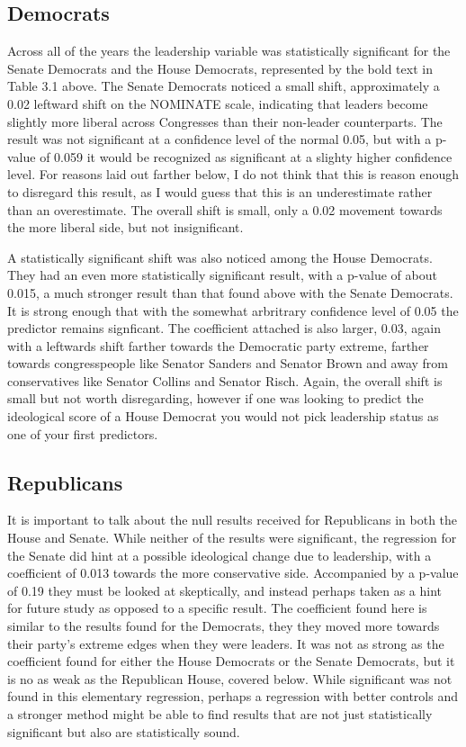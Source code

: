 \documentclass[12pt,twoside]{reedthesis}
\begin{document}
  \subsection{Democrats}\label{democrats}
  
  Across all of the years the leadership variable was statistically
  significant for the Senate Democrats and the House Democrats,
  represented by the bold text in Table 3.1 above. The Senate Democrats
  noticed a small shift, approximately a 0.02 leftward shift on the
  NOMINATE scale, indicating that leaders become slightly more liberal
  across Congresses than their non-leader counterparts. The result was not
  significant at a confidence level of the normal 0.05, but with a p-value
  of 0.059 it would be recognized as significant at a slighty higher
  confidence level. For reasons laid out farther below, I do not think
  that this is reason enough to disregard this result, as I would guess
  that this is an underestimate rather than an overestimate. The overall
  shift is small, only a 0.02 movement towards the more liberal side, but
  not insignificant.
  
  A statistically significant shift was also noticed among the House
  Democrats. They had an even more statistically significant result, with
  a p-value of about 0.015, a much stronger result than that found above
  with the Senate Democrats. It is strong enough that with the somewhat
  arbritrary confidence level of 0.05 the predictor remains signficant.
  The coefficient attached is also larger, 0.03, again with a leftwards
  shift farther towards the Democratic party extreme, farther towards
  congresspeople like Senator Sanders and Senator Brown and away from
  conservatives like Senator Collins and Senator Risch. Again, the overall
  shift is small but not worth disregarding, however if one was looking to
  predict the ideological score of a House Democrat you would not pick
  leadership status as one of your first predictors.
  
  \subsection{Republicans}\label{republicans}
  
  It is important to talk about the null results received for Republicans
  in both the House and Senate. While neither of the results were
  significant, the regression for the Senate did hint at a possible
  ideological change due to leadership, with a coefficient of 0.013
  towards the more conservative side. Accompanied by a p-value of 0.19
  they must be looked at skeptically, and instead perhaps taken as a hint
  for future study as opposed to a specific result. The coefficient found
  here is similar to the results found for the Democrats, they they moved
  more towards their party's extreme edges when they were leaders. It was
  not as strong as the coefficient found for either the House Democrats or
  the Senate Democrats, but it is no as weak as the Republican House,
  covered below. While significant was not found in this elementary
  regression, perhaps a regression with better controls and a stronger
  method might be able to find results that are not just statistically
  significant but also are statistically sound.
  
\end{document}
